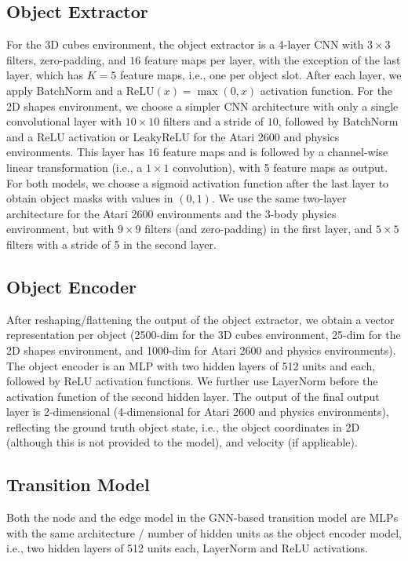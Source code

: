 \documentclass{article} %
\begin{document}
\subsection{Object Extractor}
For the 3D cubes environment, the object extractor is a 4-layer CNN with $3\times 3$ filters, zero-padding, and $16$ feature maps per layer, with the exception of the last layer, which has $K=5$ feature maps, i.e., one per object slot. After each layer, we apply BatchNorm \citep{ioffe2015batch} and a $\mathrm{ReLU}(x)=\max(0,x)$ activation function. For the 2D shapes environment, we choose a simpler CNN architecture with only a single convolutional layer with $10\times 10$ filters and a stride of $10$, followed by BatchNorm and a ReLU activation or LeakyReLU \citep{xu2015empirical} for the Atari 2600 and physics environments. This layer has $16$ feature maps and is followed by a channel-wise linear transformation (i.e., a $1\times1$ convolution), with 5 feature maps as output. For both models, we choose a sigmoid activation function after the last layer to obtain object masks with values in $(0, 1)$. We use the same two-layer architecture for the Atari 2600 environments and the 3-body physics environment, but with $9\times9$ filters (and zero-padding) in the first layer, and $5\times5$ filters with a stride of 5 in the second layer.

\subsection{Object Encoder}
After reshaping/flattening the output of the object extractor, we obtain a vector representation per object (2500-dim for the 3D cubes environment, 25-dim for the 2D shapes environment, and 1000-dim for Atari 2600 and physics environments). The object encoder is an MLP with two hidden layers of 512 units and each, followed by ReLU activation functions. We further use LayerNorm \citep{ba2016layer} before the activation function of the second hidden layer.  The output of the final output layer is 2-dimensional (4-dimensional for Atari 2600 and physics environments), reflecting the ground truth object state, i.e., the object coordinates in 2D (although this is not provided to the model), and velocity (if applicable).

\subsection{Transition Model}
Both the node and the edge model in the GNN-based transition model are MLPs with the same architecture / number of hidden units as the object encoder model, i.e., two hidden layers of 512 units each, LayerNorm and ReLU activations.
\end{document}
